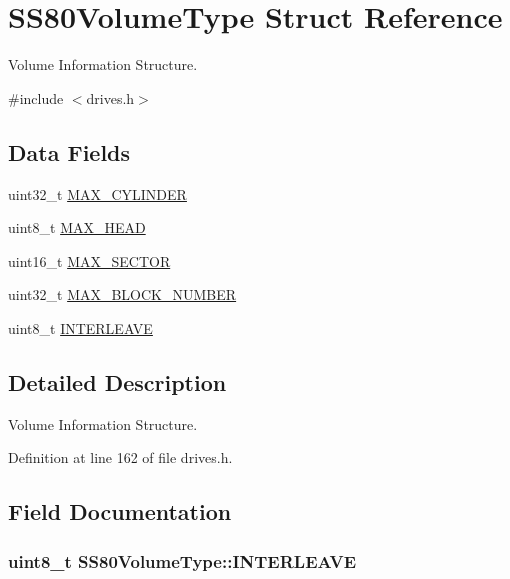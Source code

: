 \hypertarget{structSS80VolumeType}{}\section{S\+S80\+Volume\+Type Struct Reference}
\label{structSS80VolumeType}


Volume Information Structure.  




{\ttfamily \#include $<$drives.\+h$>$}

\subsection*{Data Fields}
\begin{DoxyCompactItemize}
\item 
uint32\+\_\+t \hyperlink{structSS80VolumeType_a53b65739246cea4e0d9095c88b03be8e}{M\+A\+X\+\_\+\+C\+Y\+L\+I\+N\+D\+ER}
\item 
uint8\+\_\+t \hyperlink{structSS80VolumeType_acc2870eb0a52a0e7f4dc57f036d903b1}{M\+A\+X\+\_\+\+H\+E\+AD}
\item 
uint16\+\_\+t \hyperlink{structSS80VolumeType_a0a367b3bf05801cdee9dadc8324a3bdb}{M\+A\+X\+\_\+\+S\+E\+C\+T\+OR}
\item 
uint32\+\_\+t \hyperlink{structSS80VolumeType_afe3db69c9ec54fa6d9fd48f3e6e9097b}{M\+A\+X\+\_\+\+B\+L\+O\+C\+K\+\_\+\+N\+U\+M\+B\+ER}
\item 
uint8\+\_\+t \hyperlink{structSS80VolumeType_accc9f011ff8edebcc6d781d1aa51f16d}{I\+N\+T\+E\+R\+L\+E\+A\+VE}
\end{DoxyCompactItemize}


\subsection{Detailed Description}
Volume Information Structure. 

Definition at line 162 of file drives.\+h.



\subsection{Field Documentation}
\subsubsection[{\texorpdfstring{I\+N\+T\+E\+R\+L\+E\+A\+VE}{INTERLEAVE}}]{\setlength{\rightskip}{0pt plus 5cm}uint8\+\_\+t S\+S80\+Volume\+Type\+::\+I\+N\+T\+E\+R\+L\+E\+A\+VE}\hypertarget{structSS80VolumeType_accc9f011ff8edebcc6d781d1aa51f16d}{}\label{structSS80VolumeType_accc9f011ff8edebcc6d781d1aa51f16d}


